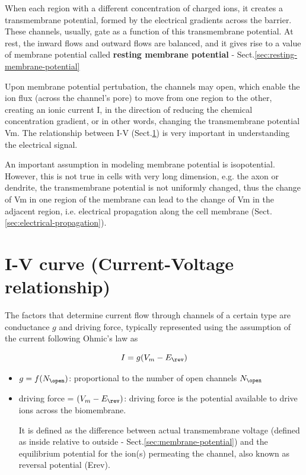 When each region with a different concentration of charged ions, it creates a
transmembrane potential, formed by the electrical gradients across the barrier.
These channels, usually, gate as a function of this transmembrane potential.
At rest, the inward flows and outward flows are balanced, and it gives rise to a
value of membrane potential called {\bf resting membrane potential} -
Sect.\ref{sec:resting-membrane-potential}

Upon membrane potential pertubation, the channels may open, which enable the ion
flux (across the channel's pore) to move from one region to the other, creating
an ionic current I, in the direction of reducing the chemical concentration
gradient, or in other words, changing the transmembrane potential Vm.  The
relationship between I-V (Sect.\ref{sec:I-V-curve}) is very important in
understanding the electrical signal.

An important assumption in modeling membrane potential is isopotential. However,
this is not true in cells with very long dimension, e.g. the axon or dendrite,
the transmembrane potential is not uniformly changed, thus the change of Vm in
one region of the membrane can lead to the change of Vm in the adjacent region,
i.e. electrical propagation along the cell membrane
(Sect.\ref{sec:electrical-propagation}).


\chapter{I-V curve (Current-Voltage relationship)}
\label{sec:I-V-curve}


The factors that determine current flow through channels of a certain type are
conductance $g$ and driving force, typically represented using the assumption
of the current following Ohmic's law as

\begin{equation}
I = g (V_m - E_\rev)
\end{equation}

\begin{itemize}
  \item $g = f(N_\open)$: proportional to the number of open channels $N_\open$

  \item driving force = $(V_m - E_\rev)$: driving force is the potential
  available to drive ions across the biomembrane.

  It is defined as the difference between actual transmembrane voltage
  (defined as inside relative to outside - Sect.\ref{sec:membrane-potential})
  and the equilibrium potential for the ion(s) permeating the channel, also
  known as reversal potential (Erev).
\end{itemize}

